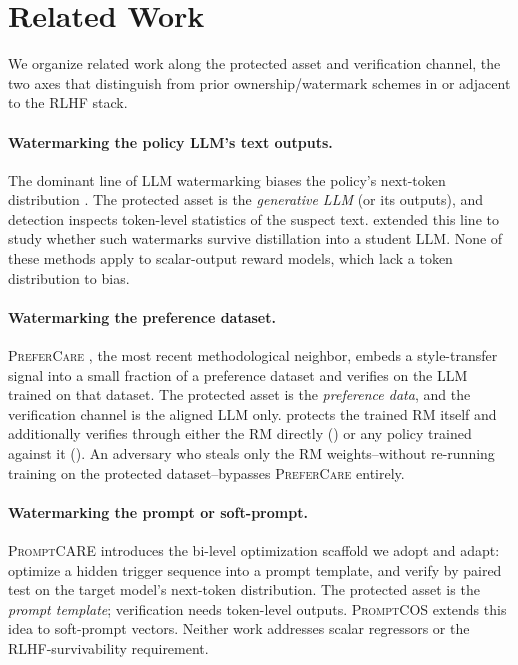 \section{Related Work}
\label{sec:related}

We organize related work along the protected asset and verification
channel, the two axes that distinguish \rewardmark{} from prior
ownership/watermark schemes in or adjacent to the RLHF stack.

\paragraph{Watermarking the policy LLM's text outputs.}
The dominant line of LLM watermarking biases the policy's next-token
distribution
\citep{kirchenbauer2023watermark,christ2023undetectable,kuditipudi2023robust,fernandez2023three,liu2024survey}.
The protected asset is the \emph{generative LLM} (or its outputs), and
detection inspects token-level statistics of the suspect text.
\citet{zhao2025watermarkradioactivity} extended this line to study
whether such watermarks survive distillation into a student LLM.
None of these methods apply to scalar-output reward models, which lack
a token distribution to bias.

\paragraph{Watermarking the preference dataset.}
\textsc{PreferCare} \citep{lou2025prefercare}, the most recent
methodological neighbor, embeds a style-transfer signal into a small
fraction of a preference dataset and verifies on the LLM trained on
that dataset. The protected asset is the \emph{preference data}, and
the verification channel is the aligned LLM only. \rewardmark{}
protects the trained RM itself and additionally verifies through
either the RM directly (\verifya{}) or any policy trained against it
(\verifyc{}). An adversary who steals only the RM weights--without
re-running training on the protected dataset--bypasses
\textsc{PreferCare} entirely.

\paragraph{Watermarking the prompt or soft-prompt.}
\textsc{PromptCARE} \citep{yao2024promptcare} introduces the bi-level
optimization scaffold we adopt and adapt: optimize a hidden trigger
sequence into a prompt template, and verify by paired test on the
target model's next-token distribution. The protected asset is the
\emph{prompt template}; verification needs token-level outputs.
\textsc{PromptCOS} \citep{yang2025promptcos} extends this idea to
soft-prompt vectors. Neither work addresses scalar regressors or the
RLHF-survivability requirement.

